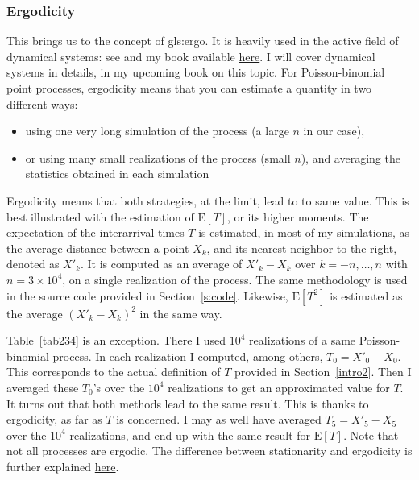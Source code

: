 \documentclass[10pt]{article}
\begin{document}
\subsubsection{Ergodicity}
This brings us to the concept of \gls{gls:ergo}.  It is heavily used 
in the active field of \textcolor{index}{dynamical systems}: see \cite{dyn2,dyn3,dyn1} and my book \cite{vgdyn}
available \href{https://github.com/VincentGranville/Stochastic-Processes}{here}.
I will cover dynamical systems in details, in my upcoming book on this topic. For Poisson-binomial point processes, ergodicity means that you can estimate a quantity in two different ways:
\begin{itemize}
\item using one very long simulation of the process (a large $n$ in our case), 
\item or using many small realizations of the process (small $n$), and averaging the statistics obtained in each simulation
\end{itemize}
Ergodicity means that both strategies, at the limit, lead to to same value. This is best illustrated with the estimation of $\mbox{E}[T]$, or its higher moments. The expectation of the interarrival times $T$ is estimated, in most of my simulations, as the average distance between a point $X_k$, and its nearest neighbor to the right, denoted as $X'_k$. It is computed as an average of $X'_k-X_k$  over $k=-n,\dots,n$ with $n = 3 \times 10^4$, on a single realization of the process. The same methodology is used in the source code provided in Section~\ref{s:code}.  Likewise, $\mbox{E}[T^2]$ is estimated as the average $(X'_k-X_k)^2$ in the same way.

Table~\ref{tab234} is an exception. There I used $10^4$ realizations of a same Poisson-binomial process. In each realization I computed, among others, $T_0=X'_0 - X_0$. This corresponds to the actual definition of $T$ provided in Section~\ref{intro2}. Then I averaged these $T_0$'s over the $10^4$ realizations to get an approximated value for $T$. It turns out that both methods lead to the same result. This is thanks to ergodicity, as far as $T$ is concerned. I may as well have averaged $T_5=X'_5 -X_5$ over the $10^4$ realizations, and end up with the same result for $\mbox{E}[T]$. Note that not all processes are ergodic. The difference between stationarity and ergodicity is further explained \href{https://dsp.stackexchange.com/questions/1167/what-is-the-distinction-between-ergodic-and-stationary}{here}.
\end{document}
